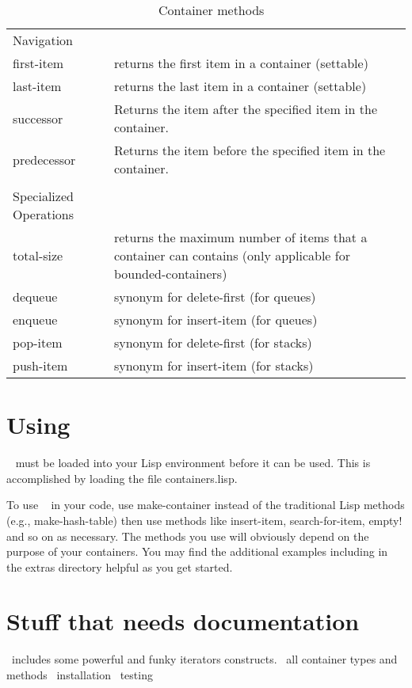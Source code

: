 \documentclass{acm_proc_article-sp}
\begin{document}
\begin{table*}[htb]
\begin{center}
\begin{tabular}{|l|p{4 in}|}
& \\ \hline
Navigation & \\ \hline
first-item & returns the first item in a container (settable) \\
last-item  & returns the last item in a container (settable) \\
successor & Returns the item after the specified item in the container. \\
predecessor & Returns the item before the specified item in the
container. \\ 

& \\ \hline
Specialized Operations & \\ \hline

total-size & returns the maximum number of items that a container
can contains (only applicable for bounded-containers) \\

dequeue & synonym for delete-first (for queues) \\
enqueue & synonym for insert-item (for queues) \\

pop-item & synonym for delete-first (for stacks) \\
push-item & synonym for insert-item (for stacks) \\ \hline

\end{tabular}
\end{center}
\label{tbl:method-types}
\caption{\clcl~ Container methods}
\end{table*}


\section{Using \clcl~}
\clcl~ must be loaded into your Lisp environment before it can be used.
This is accomplished by loading the file containers.lisp. 

To use \clcl~ in your code, use make-container instead of the traditional
Lisp methods (e.g., make-hash-table) then use methods like insert-item,
search-for-item, empty! and so on as necessary. The methods you use will
obviously depend on the purpose of your containers. You may find the
additional examples including in the extras directory helpful as you get
started. 


\section{Stuff that needs documentation}
\clcl~includes some powerful and funky iterators constructs.
\clcl~all container types and methods
\clcl~installation
\clcl~testing
\end{document}
